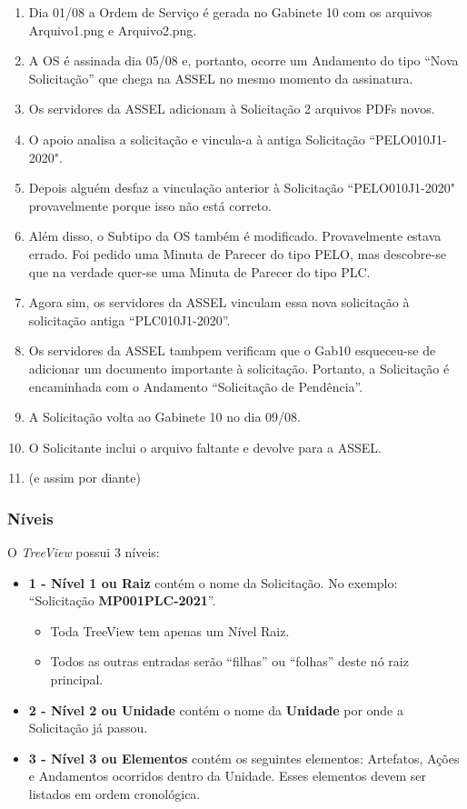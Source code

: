	\begin{enumerate}
		\item Dia 01/08 a Ordem de Serviço é gerada no Gabinete 10 com os arquivos Arquivo1.png e Arquivo2.png.
		\item A OS é assinada dia 05/08 e, portanto, ocorre um Andamento do tipo ``Nova Solicitação'' que chega na ASSEL no mesmo momento da assinatura.		
		\item Os servidores da ASSEL adicionam à Solicitação 2 arquivos PDFs novos.
		\item O apoio analisa a solicitação e vincula-a à antiga Solicitação ``PELO010J1-2020".
		\item Depois alguém desfaz a vinculação anterior à Solicitação ``PELO010J1-2020" provavelmente porque isso não está correto.
		\item Além disso, o Subtipo da OS também é modificado. Provavelmente estava errado. Foi pedido uma Minuta de Parecer do tipo PELO, mas descobre-se que na verdade quer-se uma Minuta de Parecer do tipo PLC.
		\item Agora sim, os servidores da ASSEL vinculam essa nova solicitação à solicitação antiga ``PLC010J1-2020''.
		\item Os servidores da ASSEL tambpem verificam que o Gab10 esqueceu-se de adicionar um documento importante à solicitação. Portanto, a Solicitação é encaminhada com o Andamento ``Solicitação de Pendência''.
		\item A Solicitação volta ao Gabinete 10 no dia 09/08.
		\item O Solicitante inclui o arquivo faltante e devolve para a ASSEL.		
		\item (e assim por diante)
	\end{enumerate}
	
	\newpage
	
	\subsubsection{Níveis}
	
	O \emph{TreeView} possui 3 níveis:
	
	\begin{itemize}
		\item \textbf{1 - Nível 1 ou Raiz} contém o nome da Solicitação. No exemplo: ``Solicitação \textbf{MP001PLC-2021}''.
			\begin{itemize}
				\item Toda TreeView tem apenas um Nível Raiz.
				\item Todos as outras entradas serão ``filhas'' ou ``folhas'' deste nó raiz principal.
			\end{itemize}
		\item \textbf{2 - Nível 2 ou Unidade} contém o nome da \textbf{Unidade} por onde a Solicitação já passou.
		
		\item \textbf{3 - Nível 3 ou Elementos} contém os seguintes elementos: Artefatos, Ações e Andamentos ocorridos dentro da Unidade. Esses elementos devem ser listados em ordem cronológica.		
		
		
	\end{itemize}

